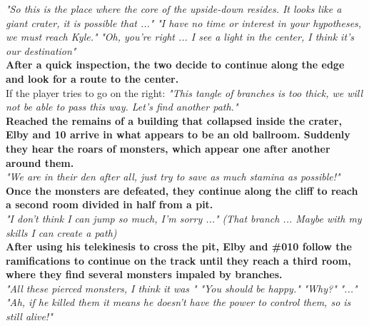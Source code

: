 \begin{dialogue}
	
	  \textit{"So this is the place where the core of the upside-down resides. It looks like a giant crater, it is possible that ..."}
	 \textit{"I have no time or interest in your hypotheses, we must reach Kyle."}
	 \textit{"Oh, you're right ... I see a light in the center, I think it's our destination"}\\
	
	\textbf{After a quick inspection, the two decide to continue along the edge and look for a route to the center.}\\
	
	If the player tries to go on the right:
	 \textit{"This tangle of branches is too thick, we will not be able to pass this way. Let's find another path."}\\
	
	\textbf{Reached the remains of a building that collapsed inside the crater, Elby and 10 arrive in what appears to be
an old ballroom. Suddenly they hear the roars of monsters, which appear one after another around them.}\\
	
	
	  \textit{"We are in their den after all, just try to save as much stamina as possible!"}\\
	
	\textbf{Once the monsters are defeated, they continue along the cliff to reach a second room divided in half
from a pit.}\\
	
	 \textit{"I don't think I can jump so much, I'm sorry ..."}
	 \textit{(That branch ... Maybe with my skills I can create a path)}\\
	
	\textbf{After using his telekinesis to cross the pit, Elby and \#010 follow the ramifications to continue on the track until they reach a third room, where they find several monsters impaled by branches.}\\
	
	
	 \textit{"All these pierced monsters, I think it was "}
	 \textit{"You should be happy."}
	 \textit{"Why?"}
	 \textit{"..."}
	 \textit{"Ah, if he killed them it means he doesn't have the power to control them, so  is still alive!"}
	 \\
	

\end{dialogue}
